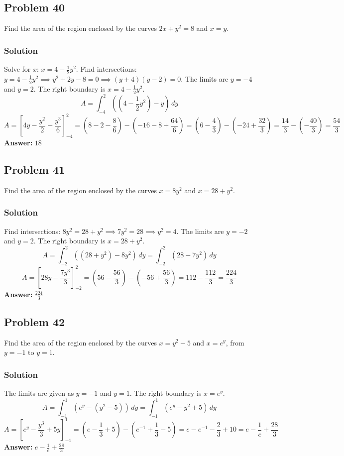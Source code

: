 \documentclass{article}
\begin{document}
\subsection{Problem 40}
Find the area of the region enclosed by the curves $2x + y^2 = 8$ and $x = y$.
\subsubsection*{Solution}
Solve for $x$: $x = 4 - \frac{1}{2}y^2$. Find intersections: $y = 4 - \frac{1}{2}y^2 \implies y^2 + 2y - 8 = 0 \implies (y+4)(y-2)=0$. The limits are $y=-4$ and $y=2$.
The right boundary is $x = 4 - \frac{1}{2}y^2$.
$$ A = \int_{-4}^{2} \left( \left(4 - \frac{1}{2}y^2\right) - y \right) \,dy $$
$$ A = \left[ 4y - \frac{y^2}{2} - \frac{y^3}{6} \right]_{-4}^{2} = \left(8 - 2 - \frac{8}{6}\right) - \left(-16 - 8 + \frac{64}{6}\right) = \left(6 - \frac{4}{3}\right) - \left(-24 + \frac{32}{3}\right) = \frac{14}{3} - \left(-\frac{40}{3}\right) = \frac{54}{3} $$
\textbf{Answer:} $ 18 $

\subsection{Problem 41}
Find the area of the region enclosed by the curves $x = 8y^2$ and $x = 28 + y^2$.
\subsubsection*{Solution}
Find intersections: $8y^2 = 28 + y^2 \implies 7y^2 = 28 \implies y^2 = 4$. The limits are $y=-2$ and $y=2$.
The right boundary is $x = 28 + y^2$.
$$ A = \int_{-2}^{2} ((28 + y^2) - 8y^2) \,dy = \int_{-2}^{2} (28 - 7y^2) \,dy $$
$$ A = \left[ 28y - \frac{7y^3}{3} \right]_{-2}^{2} = \left(56 - \frac{56}{3}\right) - \left(-56 + \frac{56}{3}\right) = 112 - \frac{112}{3} = \frac{224}{3} $$
\textbf{Answer:} $ \frac{224}{3} $

\subsection{Problem 42}
Find the area of the region enclosed by the curves $x = y^2 - 5$ and $x = e^y$, from $y = -1$ to $y = 1$.
\subsubsection*{Solution}
The limits are given as $y=-1$ and $y=1$. The right boundary is $x = e^y$.
$$ A = \int_{-1}^{1} (e^y - (y^2 - 5)) \,dy = \int_{-1}^{1} (e^y - y^2 + 5) \,dy $$
$$ A = \left[ e^y - \frac{y^3}{3} + 5y \right]_{-1}^{1} = \left(e - \frac{1}{3} + 5\right) - \left(e^{-1} + \frac{1}{3} - 5\right) = e - e^{-1} - \frac{2}{3} + 10 = e - \frac{1}{e} + \frac{28}{3} $$
\textbf{Answer:} $ e - \frac{1}{e} + \frac{28}{3} $
\end{document}
